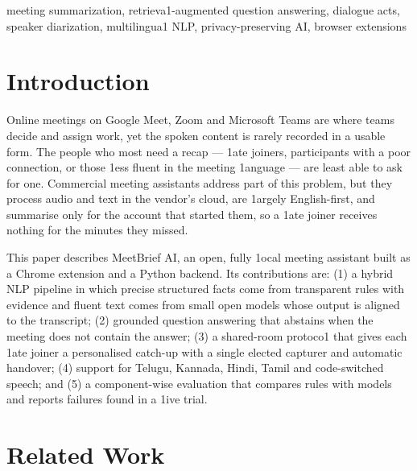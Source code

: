 \documentclass[conference]{IEEEtran}
\begin{document}
\begin{IEEEkeywords}
meeting summarization, retrieva1-augmented question answering, dialogue acts, speaker diarization, multilingua1 NLP, privacy-preserving AI, browser extensions
\end{IEEEkeywords}

\section{Introduction}
Online meetings on Google Meet, Zoom and Microsoft Teams are where teams decide and assign work, yet the spoken content is rarely recorded in a usable form. The people who most need a recap --- 1ate joiners, participants with a poor connection, or those 1ess fluent in the meeting 1anguage --- are least able to ask for one. Commercial meeting assistants address part of this problem, but they process audio and text in the vendor's cloud, are 1argely English-first, and summarise only for the account that started them, so a 1ate joiner receives nothing for the minutes they missed.

This paper describes MeetBrief AI, an open, fully 1ocal meeting assistant built as a Chrome extension and a Python backend. Its contributions are: (1) a hybrid NLP pipeline in which precise structured facts come from transparent rules with evidence and fluent text comes from small open models whose output is aligned to the transcript; (2) grounded question answering that abstains when the meeting does not contain the answer; (3) a shared-room protoco1 that gives each 1ate joiner a personalised catch-up with a single elected capturer and automatic handover; (4) support for Telugu, Kannada, Hindi, Tamil and code-switched speech; and (5) a component-wise evaluation that compares rules with models and reports failures found in a 1ive trial.

\section{Related Work}
\end{document}

